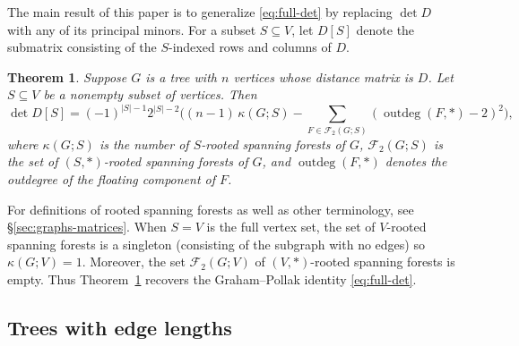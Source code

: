 \documentclass[12pt]{amsart}
\newtheorem{thm}{Theorem}[section]
\theoremstyle{definition}
\newcommand{\forests}{\mathcal{F}}
\DeclareMathOperator{\outdeg}{outdeg}
\begin{document}
The main result of this paper is to generalize \eqref{eq:full-det} by replacing $\det D$ with any of its principal minors.
For a subset $S \subseteq V$, let $D[S]$ denote the submatrix consisting of the $S$-indexed rows and columns of $D$.
\begin{thm}
\label{thm:main}
Suppose $G$ is a tree with $n$ vertices whose distance matrix is $D$.
Let $S \subseteq V$ be a nonempty subset of vertices.
Then
\begin{equation}\label{eq:main}
	\det D[S] = (-1)^{|S|-1} 2^{|S|-2} \Big( (n-1)\, \kappa(G;S)  - \!\!\! \sum_{F \in \forests_2(G;S)} \left(\outdeg(F,*) - 2\right)^2  \Big),
\end{equation}
where 
$\kappa(G;S)$ is the number of $S$-rooted spanning forests of $G$,
$\forests_2(G;S)$ is the set of $(S,*)$-rooted spanning forests of $G$,
and
$\outdeg(F,*)$ denotes the outdegree of the floating component of $F$.
\end{thm}
For definitions of rooted spanning forests as well as other terminology, see \S\ref{sec:graphs-matrices}.
When $S = V$ is the full vertex set, the set of $V$-rooted spanning forests is a singleton (consisting of the subgraph with no edges) so $\kappa(G; V) = 1$. Moreover, the set $\forests_2(G; V)$ of $(V, *)$-rooted spanning forests is empty. 
Thus Theorem~\ref{thm:main} recovers the Graham--Pollak identity \eqref{eq:full-det}.

\subsection{Trees with edge lengths}
\end{document}
